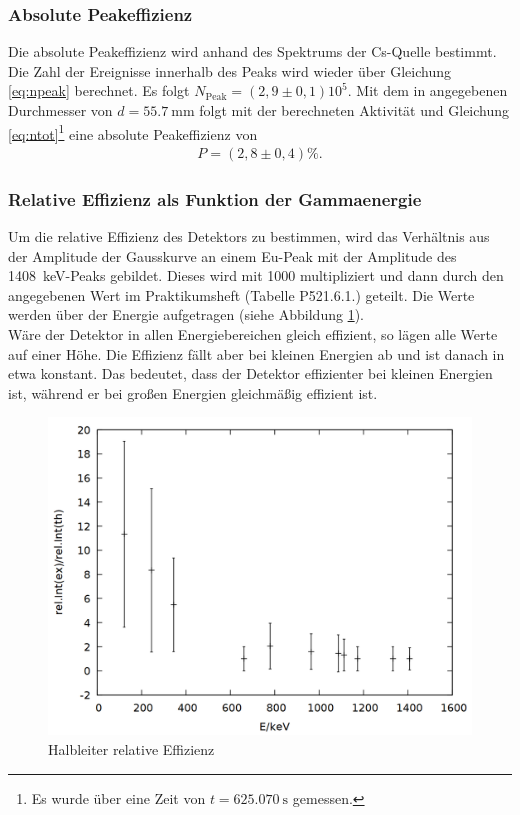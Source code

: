 \subsubsection*{Absolute Peakeffizienz}
Die absolute Peakeffizienz wird anhand des Spektrums der Cs-Quelle bestimmt. Die Zahl der Ereignisse innerhalb des Peaks wird wieder über Gleichung \ref{eq:npeak} berechnet. Es folgt $N_\mathrm{Peak}=(2,9 \pm 0,1)10^5$. Mit dem in \cite{praktikumsheft} angegebenen Durchmesser von $d=\SI{55.7}{\milli\metre}$ folgt mit der berechneten Aktivität und Gleichung \ref{eq:ntot}\footnote{Es wurde über eine Zeit von $t=\SI{625.070}{\second}$ gemessen.} eine absolute Peakeffizienz von
\begin{align*}
  P=(2,8 \pm 0,4)\%.
\end{align*}

\subsubsection*{Relative Effizienz als Funktion der Gammaenergie}
Um die relative Effizienz des Detektors zu bestimmen, wird das Verhältnis aus der Amplitude der Gausskurve an einem Eu-Peak mit der Amplitude des \SI{1408}{keV}-Peaks gebildet. Dieses wird mit 1000 multipliziert und dann durch den angegebenen Wert im Praktikumsheft \cite{praktikumsheft} (Tabelle P521.6.1.) geteilt. Die Werte werden über der Energie aufgetragen (siehe Abbildung \ref{fig:ge_relint}). \\

Wäre der Detektor in allen Energiebereichen gleich effizient, so lägen alle Werte auf einer Höhe. Die Effizienz fällt aber bei kleinen Energien ab und ist danach in etwa konstant. Das bedeutet, dass der Detektor effizienter bei kleinen Energien ist, während er bei großen Energien gleichmäßig effizient ist.

\begin{figure}[h]
\centering
\includegraphics[width=0.7\linewidth]{data/ge_relint.png}
\caption{Halbleiter relative Effizienz}
\label{fig:ge_relint}
\end{figure}

